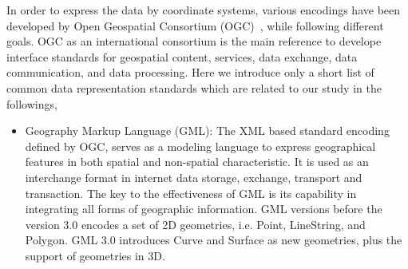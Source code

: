 \documentclass[a4paper,12pt]{article}
\begin{document}
In order to express the data by coordinate systems, various encodings have been developed by Open Geospatial Consortium (OGC)~\cite{ogc}, while following different goals. OGC as an international consortium is the main reference to develope interface standards for geospatial content, services, data exchange, data communication, and data processing. Here we introduce only a short list of common data representation standards which are related to our study in the followings,
\begin{itemize}


\item Geography Markup Language (GML): The XML based standard encoding defined by OGC, serves as a modeling language to express geographical features in both spatial and non-spatial characteristic. It is used as an interchange format in internet data storage, exchange, transport and transaction. The key to the effectiveness of GML is its capability in integrating all forms of geographic information. %
GML versions before the version 3.0 encodes a set of 2D geometries, i.e. Point, LineString, and Polygon. GML 3.0 introduces Curve and Surface as new geometries, plus the support of geometries in 3D.


\end{itemize}
\end{document}

